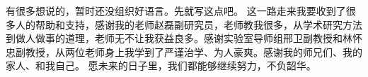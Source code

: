 \cleardoublepage
{}
有很多想说的，暂时还没组织好语言。先就写这点吧。
这一路走来我要收到了很多人的帮助和支持，感谢我的老师赵磊副研究员，老师教我很多，从学术研究方法到做人做事的道理，老师无不让我获益良多。感谢实验室导师组邢卫副教授和林怀忠副教授，从两位老师身上我学到了严谨治学、为人豪爽。感谢我的师兄们、我的家人、和我自己。
愿未来的日子里，我们都能够继续努力，不负韶华。